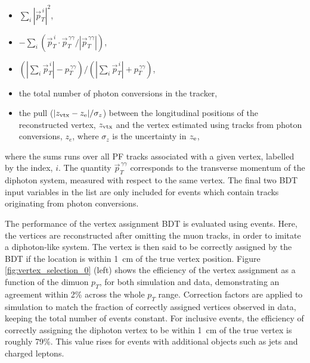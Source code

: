 \begin{itemize}
    \item $\sum_i |\vec{p}^{\,i}_T|^2$,
    \item $-\sum_i (\vec{p}^{\,i}_T\cdot \vec{p}_T^{\,\gamma\gamma}/|\vec{p}_T^{\,\gamma\gamma}|)$,
    \item $(|\sum_i \vec{p}^{\,i}_T| - p_T^{\,\gamma\gamma})/(|\sum_i \vec{p}^{\,i}_T| + p_T^{\,\gamma\gamma})$,
    \item the total number of photon conversions in the tracker,
    \item the pull ($|z_{\rm{vtx}}-z_{\rm{e}}|/\sigma_z$) between the longitudinal positions of the reconstructed vertex, $z_{\rm{vtx}}$ and the vertex estimated using tracks from photon conversions, $z_e$, where $\sigma_z$ is the uncertainty in $z_{\rm{e}}$,
\end{itemize}

\noindent
where the sums runs over all PF tracks associated with a given vertex, labelled by the index, $i$. The quantity $\vec{p}_T^{\,\gamma\gamma}$ corresponds to the transverse momentum of the diphoton system, measured with respect to the same vertex. The final two BDT input variables in the list are only included for events which contain tracks originating from photon conversions. 

The performance of the vertex assignment BDT is evaluated using \Zmumu events. Here, the vertices are reconstructed after omitting the muon tracks, in order to imitate a diphoton-like system. The vertex is then said to be correctly assigned by the BDT if the location is within 1~cm of the true vertex position. Figure \ref{fig:vertex_selection_0} (left) shows the efficiency of the vertex assignment as a function of the dimuon $p_T$, for both simulation and data, demonstrating an agreement within 2\% across the whole $p_T$ range. Correction factors are applied to simulation to match the fraction of correctly assigned vertices observed in data, keeping the total number of events constant. For inclusive \Hgg events, the efficiency of correctly assigning the diphoton vertex to be within 1~cm of the true vertex is roughly 79\%. This value rises for events with additional objects such as jets and charged leptons.

